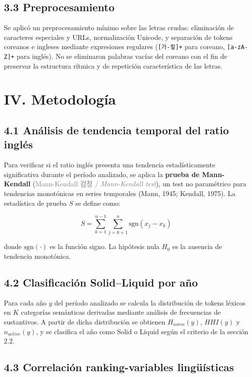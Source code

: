\documentclass[11pt,a4paper]{article}
\newcommand{\term}[3]{\textbf{#1} (\textcolor{gray}{#2 / \textit{#3}})}
\begin{document}
\subsection*{3.3 Preprocesamiento}

Se aplicó un preprocesamiento mínimo sobre las letras crudas:
eliminación de caracteres especiales y URLs,
normalización Unicode,
y separación de tokens coreanos e ingleses mediante expresiones regulares
(\texttt{[가-힣]+} para coreano, \texttt{[a-zA-Z]+} para inglés).
No se eliminaron palabras vacías del coreano con el fin de preservar
la estructura rítmica y de repetición característica de las letras.

\section*{IV. Metodología}

\subsection*{4.1 Análisis de tendencia temporal del ratio inglés}

Para verificar si el ratio inglés presenta una tendencia estadísticamente
significativa durante el período analizado, se aplica la
\term{prueba de Mann-Kendall}{Mann-Kendall 검정}{Mann-Kendall test},
un test no paramétrico para tendencias monotónicas en series temporales
(Mann, 1945; Kendall, 1975).
La estadística de prueba $S$ se define como:

\[
S = \sum_{k=1}^{n-1}\sum_{j=k+1}^{n} \mathrm{sgn}(x_j - x_k)
\]

donde $\mathrm{sgn}(\cdot)$ es la función signo.
La hipótesis nula $H_0$ es la ausencia de tendencia monotónica.

\subsection*{4.2 Clasificación Solid--Liquid por año}

Para cada año $y$ del período analizado se calcula la distribución
de tokens léxicos en $K$ categorías semánticas derivadas mediante
análisis de frecuencias de sustantivos.
A partir de dicha distribución se obtienen $H_{norm}(y)$, $\mathit{HHI}(y)$
y $n_{active}(y)$, y se clasifica el año como Solid o Liquid
según el criterio de la sección 2.2.

\subsection*{4.3 Correlación ranking-variables lingüísticas}
\end{document}
